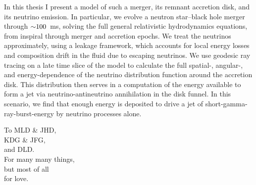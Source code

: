 \documentclass[12pt]{report}
\begin{document}
In this thesis I present a model of such a merger, its remnant accretion disk,
and its neutrino emission.
In particular, we evolve a neutron star--black hole merger through $\mathord{\sim}100$~ms,
solving the full general relativistic hydrodynamics equations,
from inspiral through merger and accretion epochs.
We treat the neutrinos approximately, using a leakage framework,
which accounts for local energy losses and composition drift in the fluid due
to escaping neutrinos.
We use geodesic ray tracing on a late time slice of the model to calculate the full
spatial-, angular-, and energy-dependence of the neutrino distribution function
around the accretion disk.
This distribution then serves in a computation of the energy available to
form a jet via neutrino-antineutrino annihilation in the disk funnel.
In this scenario, we find that enough energy is deposited
to drive a jet of short-gamma-ray-burst-energy by neutrino processes alone.

\newpage

\tableofcontents
\newpage

\listoftables
{} %
\newpage

\listoffigures
{} %
\newpage

\begin{center}
  \null
  \vspace{2.7in}
  \bigskip
  To MLD \& JHD,\\
  KDG \& JFG,\\
  and DLD.\\
  For many many things,\\
  but most of all\\
  for love.
  \newpage
\end{center}









\newpage


\end{document}
